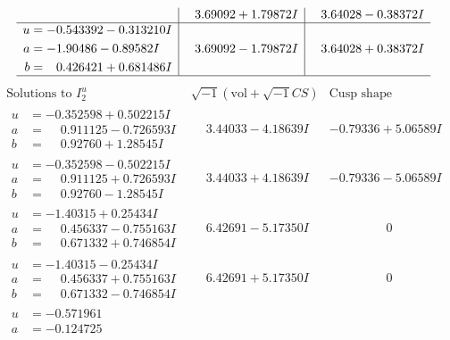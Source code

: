 \documentclass[1p]{elsarticle_modified}
\theoremstyle{definition}
\newcommand{\I}{\sqrt{-1}}
\begin{document}
$$\begin{array}{c|c|c}
 & \phantom{-}3.69092 + 1.79872 I & \phantom{-}3.64028 - 0.38372 I \\ \hline\begin{aligned}
u &= -0.543392 - 0.313210 I \\
a &= -1.90486 - 0.89582 I \\
b &= \phantom{-}0.426421 + 0.681486 I\end{aligned}
 & \phantom{-}3.69092 - 1.79872 I & \phantom{-}3.64028 + 0.38372 I\\
 \hline 
 \end{array}$$\newpage$$\begin{array}{c|c|c}  
\text{Solutions to }I^u_{2}& \I (\text{vol} + \sqrt{-1}CS) & \text{Cusp shape}\\
 \hline 
\begin{aligned}
u &= -0.352598 + 0.502215 I \\
a &= \phantom{-}0.911125 - 0.726593 I \\
b &= \phantom{-}0.92760 + 1.28545 I\end{aligned}
 & \phantom{-}3.44033 - 4.18639 I & -0.79336 + 5.06589 I \\ \hline\begin{aligned}
u &= -0.352598 - 0.502215 I \\
a &= \phantom{-}0.911125 + 0.726593 I \\
b &= \phantom{-}0.92760 - 1.28545 I\end{aligned}
 & \phantom{-}3.44033 + 4.18639 I & -0.79336 - 5.06589 I \\ \hline\begin{aligned}
u &= -1.40315 + 0.25434 I \\
a &= \phantom{-}0.456337 - 0.755163 I \\
b &= \phantom{-}0.671332 + 0.746854 I\end{aligned}
 & \phantom{-}6.42691 - 5.17350 I & \phantom{-0.000000 } 0 \\ \hline\begin{aligned}
u &= -1.40315 - 0.25434 I \\
a &= \phantom{-}0.456337 + 0.755163 I \\
b &= \phantom{-}0.671332 - 0.746854 I\end{aligned}
 & \phantom{-}6.42691 + 5.17350 I & \phantom{-0.000000 } 0 \\ \hline\begin{aligned}
u &= -0.571961\phantom{ +0.000000I} \\
a &= -0.124725\phantom{ +0.000000I} \\

\end{aligned}
\end{array}$$
\end{document}
